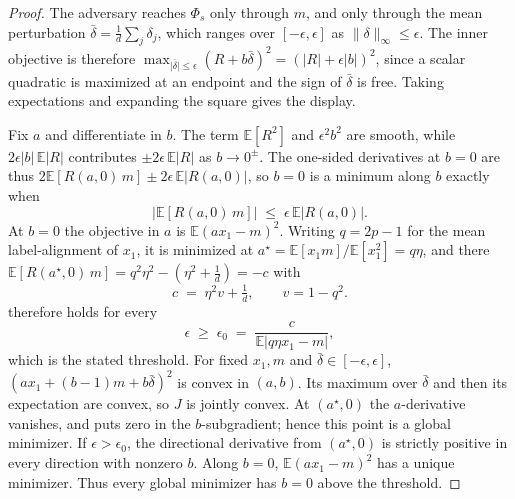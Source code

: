 \documentclass{article} %
\theoremstyle{plain}
\begin{document}
\begin{proof}
The adversary reaches $\Phi_s$ only through $m$, and only through the mean perturbation
$\bar\delta = \frac{1}{d}\sum_j \delta_j$, which ranges over $[-\epsilon, \epsilon]$ as
$\lVert\delta\rVert_\infty \le \epsilon$. The inner objective is therefore
$\max_{\lvert\bar\delta\rvert\le\epsilon}(R + b\bar\delta)^2
= (\lvert R\rvert + \epsilon\lvert b\rvert)^2$, since a scalar quadratic is maximized at an endpoint
and the sign of $\bar\delta$ is free. Taking expectations and expanding the square gives the display.

Fix $a$ and differentiate in $b$. The term $\mathbb{E}[R^2]$ and $\epsilon^2 b^2$ are smooth, while
$2\epsilon\lvert b\rvert\,\mathbb{E}\lvert R\rvert$ contributes $\pm 2\epsilon\,\mathbb{E}\lvert R\rvert$
as $b\to 0^{\pm}$. The one-sided derivatives at $b=0$ are thus
$2\mathbb{E}[R(a,0)\,m] \pm 2\epsilon\,\mathbb{E}\lvert R(a,0)\rvert$, so $b=0$ is a minimum along $b$
exactly when
\begin{equation}
\big\lvert \mathbb{E}[R(a,0)\,m] \big\rvert \;\le\; \epsilon\,\mathbb{E}\lvert R(a,0)\rvert .
\label{eqn:kink}
\end{equation}
At $b=0$ the objective in $a$ is $\mathbb{E}(a x_1 - m)^2$. Writing $q=2p-1$ for the mean
label-alignment of $x_1$, it is minimized at
$a^\star = \mathbb{E}[x_1 m]/\mathbb{E}[x_1^2] = q\eta$, and there
$\mathbb{E}[R(a^\star,0)\,m] = q^2\eta^2 - (\eta^2 + \tfrac1d) = -c$ with
\begin{equation}
c \;=\; \eta^2 v + \tfrac{1}{d}, \qquad v = 1-q^2 .
\label{eqn:c}
\end{equation}
 therefore holds for every
\begin{equation}
\epsilon \;\ge\; \epsilon_0 \;=\; \frac{c}{\mathbb{E}\lvert q\eta x_1 - m\rvert},
\label{eqn:eps0}
\end{equation}
which is the stated threshold. For fixed $x_1,m$ and $\bar\delta\in[-\epsilon,\epsilon]$,
$(a x_1+(b-1)m+b\bar\delta)^2$ is convex in $(a,b)$. Its maximum over $\bar\delta$ and then its
expectation are convex, so $J$ is jointly convex. At $(a^\star,0)$ the $a$-derivative vanishes,
and  puts zero in the $b$-subgradient; hence this point is a global minimizer. If
$\epsilon>\epsilon_0$, the directional derivative from $(a^\star,0)$ is strictly positive in
every direction with nonzero $b$. Along $b=0$, $\mathbb E(a x_1-m)^2$ has a unique minimizer.
Thus every global minimizer has $b=0$ above the threshold.
\end{proof}
\end{document}
